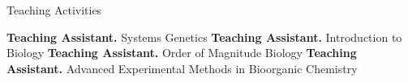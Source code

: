 \begin{rubric}{Teaching Activities}

\entry*[2017--2018]%
	\textbf{Teaching Assistant.} Systems Genetics
\entry*[2016]
	\textbf{Teaching Assistant.} Introduction to Biology
\entry*[2015]
	\textbf{Teaching Assistant.} Order of Magnitude Biology
\entry*[2014]
	\textbf{Teaching Assistant.} Advanced Experimental Methods in Bioorganic
	Chemistry
%
\end{rubric}
